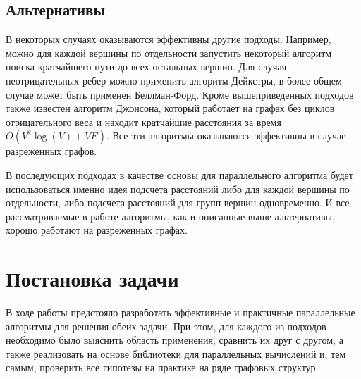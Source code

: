 \FloatBarrier
\subsection{Альтернативы}
В некоторых случаях оказываются эффективны другие подходы. Например, можно для каждой вершины по отдельности запустить некоторый алгоритм поиска кратчайшего пути до всех остальных вершин. Для случая неотрицательных ребер можно применить алгоритм Дейкстры, в более общем случае может быть применен Беллман-Форд. Кроме вышеприведенных подходов также известен алгоритм Джонсона, который работает на графах без циклов отрицательного веса и находит кратчайшие расстояния за время $O(V^2 \log(V) + VE)$. Все эти алгоритмы оказываются эффективны в случае разреженных графов.

В последующих подходах в качестве основы для параллельного алгоритма будет использоваться именно идея подсчета расстояний либо для каждой вершины по отдельности, либо подсчета расстояний для групп вершин одновременно. И все рассматриваемые в работе алгоритмы, как и описанные выше альтернативы, хорошо работают на разреженных графах.

\FloatBarrier
\section{Постановка задачи}

В ходе работы предстояло разработать эффективные и практичные параллельные алгоритмы для решения обеих задачи. При этом, для каждого из подходов необходимо было выяснить область применения, сравнить их друг с другом, а также реализовать на основе библиотеки для параллельных вычислений и, тем самым, проверить все гипотезы на практике на ряде графовых структур.   

